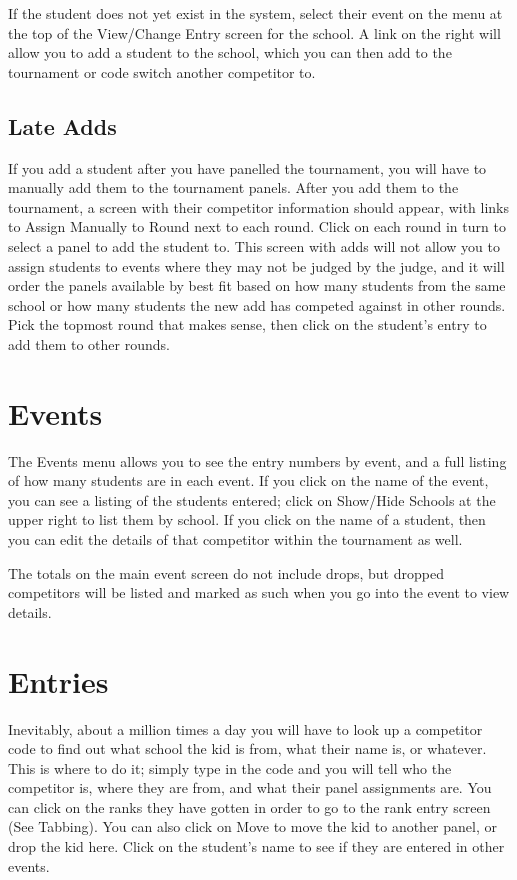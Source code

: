 \documentclass[12pt]{report} \usepackage {fullpage} \usepackage{times}
\begin{document}
If the student does not yet exist in the system, select their event on the
menu at the top of the View/Change Entry screen for the school.  A link on
the right will allow you to add a student to the school, which you can then
add to the tournament or code switch another competitor to. 

 	
\subsection{Late Adds}

If you add a student after you have panelled the tournament, you will have
to manually add them to the tournament panels.     After you add them to
the tournament, a screen with their competitor information should appear,
with links to Assign Manually to Round next to each round.  Click on each
round in turn to select a panel to add the student to.  This screen with
adds will not allow you to assign students to events where they may not be
judged by the judge, and it will order the panels available by best fit
based on how many students from the same school or how many students the
new add has competed against in other rounds.   Pick the topmost round that
makes sense, then click on the student's entry to add them to other rounds. 


\section{Events}

The Events menu allows you to see the entry numbers by event, and a full
listing of how many students are in each event.  If you click on the name
of the event, you can see a listing of the students entered;  click on
Show/Hide Schools at the upper right to list them by school.   If you click
on the name of a student, then you can edit the details of that competitor
within the tournament as well. 

The totals on the main event screen do not include drops, but dropped
competitors will be listed and marked as such when you go into the event to
view details. 

\section{Entries}

Inevitably, about a million times a day you will have to look up a
competitor code to find out what school the kid is from, what their name
is, or whatever.   This is where to do it; simply type in the code and you
will tell who the competitor is, where they are from, and what their panel
assignments are.   You can click on the ranks they have gotten in order to
go to the rank entry screen (See Tabbing).   You can also click on Move to
move the kid to another panel, or drop the kid here.   Click on the
student's name to see if they are entered in other events. 
\end{document}
